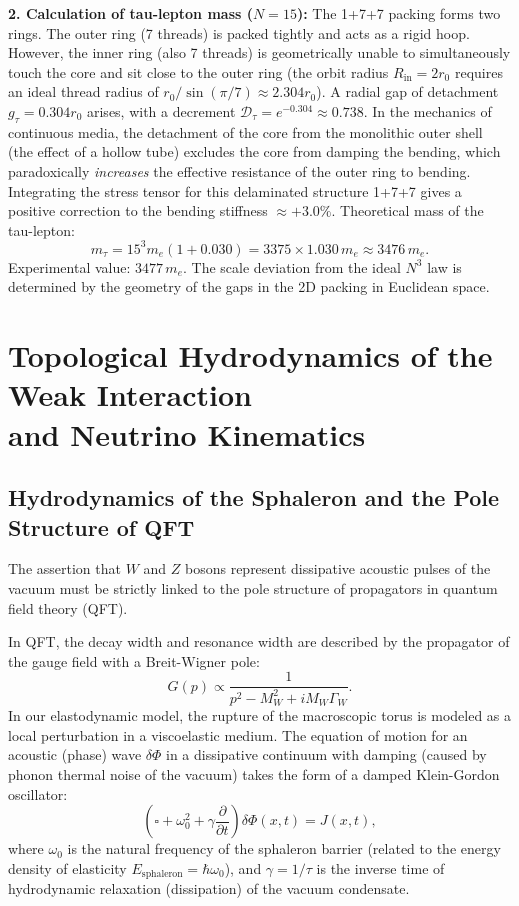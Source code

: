 \documentclass[11pt,a4paper]{article}
\begin{document}
	\textbf{2. Calculation of tau-lepton mass ($N=15$):}
	The 1+7+7 packing forms two rings. The outer ring (7 threads) is packed tightly and acts as a rigid hoop. However, the inner ring (also 7 threads) is geometrically unable to simultaneously touch the core and sit close to the outer ring (the orbit radius $R_{\text{in}} = 2r_0$ requires an ideal thread radius of $r_0 / \sin(\pi/7) \approx 2.304 r_0$). A radial gap of detachment $g_\tau = 0.304 r_0$ arises, with a decrement $\mathcal{D}_\tau = e^{-0.304} \approx 0.738$.
	In the mechanics of continuous media, the detachment of the core from the monolithic outer shell (the effect of a hollow tube) excludes the core from damping the bending, which paradoxically \textit{increases} the effective resistance of the outer ring to bending. Integrating the stress tensor for this delaminated structure 1+7+7 gives a positive correction to the bending stiffness $\approx +3.0\%$.
	Theoretical mass of the tau-lepton:
	\begin{equation}
		m_\tau = 15^3 m_e (1 + 0.030) = 3375 \times 1.030 \, m_e \approx 3476 \, m_e.
	\end{equation}
	Experimental value: $3477 \, m_e$. 
	The scale deviation from the ideal $N^3$ law is determined by the geometry of the gaps in the 2D packing in Euclidean space.
	
\section{Topological Hydrodynamics of the Weak Interaction \\ and Neutrino Kinematics}
	
\subsection{Hydrodynamics of the Sphaleron and the Pole Structure of QFT}
	The assertion that $W$ and $Z$ bosons represent dissipative acoustic pulses of the vacuum must be strictly linked to the pole structure of propagators in quantum field theory (QFT).
	
	In QFT, the decay width and resonance width are described by the propagator of the gauge field with a Breit-Wigner pole:
	\begin{equation}
		G(p) \propto \frac{1}{p^2 - M_W^2 + i M_W \Gamma_W}.
	\end{equation}
	In our elastodynamic model, the rupture of the macroscopic torus is modeled as a local perturbation in a viscoelastic medium. The equation of motion for an acoustic (phase) wave $\delta \Phi$ in a dissipative continuum with damping (caused by phonon thermal noise of the vacuum) takes the form of a damped Klein-Gordon oscillator:
	\begin{equation}
		\left( \square + \omega_0^2 + \gamma \frac{\partial}{\partial t} \right) \delta \Phi(x,t) = J(x,t),
	\end{equation}
	where $\omega_0$ is the natural frequency of the sphaleron barrier (related to the energy density of elasticity $E_{\text{sphaleron}} = \hbar \omega_0$), and $\gamma = 1/\tau$ is the inverse time of hydrodynamic relaxation (dissipation) of the vacuum condensate.
	
\end{document}
